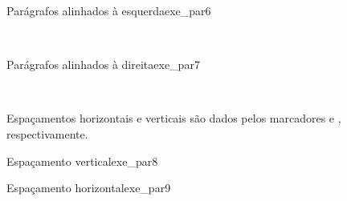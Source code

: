 \begin{texexptitled}[breakable,enhanced,middle=2mm]{Parágrafos alinhados à esquerda}{exe_par6}
\begin{flushleft}
\lipsumsentence[17-18] \\ 
\lipsumsentence[19-20]
\end{flushleft}
\end{texexptitled}

\begin{texexptitled}[breakable,enhanced,middle=2mm]{Parágrafos alinhados à direita}{exe_par7}
\begin{flushright}
\lipsumsentence[21-22] \\ 
\lipsumsentence[23-24]
\end{flushright}
\end{texexptitled}

Espaçamentos horizontais e verticais são dados pelos marcadores \texttt{\vspace{}} e \texttt{\hspace{}}, respectivamente.


\begin{texexptitled}[breakable,enhanced,middle=2mm]{Espaçamento vertical}{exe_par8}
\lipsumsentence[21-22] 
\vspace{1cm}
\lipsumsentence[23-27]
\end{texexptitled}

\begin{texexptitled}[breakable,enhanced,middle=2mm]{Espaçamento horizontal}{exe_par9}
\hspace{2cm}\lipsumsentence[28-29] \\ 
\lipsumsentence[30-31]
\end{texexptitled}




